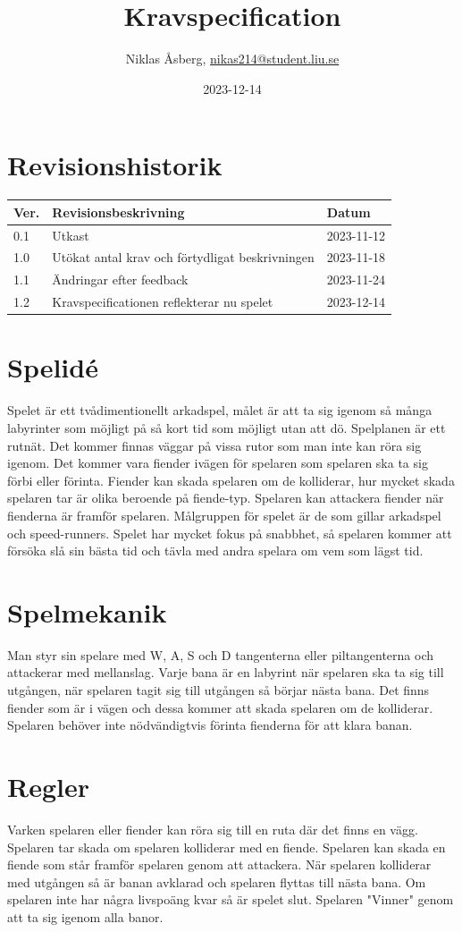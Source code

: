 \documentclass{TDP005mall}
\author{Niklas Åsberg, \url{nikas214@student.liu.se}}
\title{Kravspecification}
\date{2023-12-14}
\begin{document}
\projectpage
\section{Revisionshistorik}
\begin{table}[!h]
\begin{tabularx}{\linewidth}{|l|X|l|}
\hline
Ver. & Revisionsbeskrivning & Datum \\\hline
0.1 & Utkast & 2023-11-12 \\\hline
1.0 & Utökat antal krav och förtydligat beskrivningen & 2023-11-18 \\\hline
1.1 & Ändringar efter feedback & 2023-11-24 \\\hline
1.2 & Kravspecificationen reflekterar nu spelet & 2023-12-14 \\\hline
\end{tabularx}
\end{table}

\tableofcontents
\newpage

\section{Spelidé}
Spelet är ett tvådimentionellt arkadspel, målet är att ta sig igenom så många labyrinter som möjligt på så kort tid som möjligt utan att dö.
Spelplanen är ett rutnät. Det kommer finnas väggar på vissa rutor som man inte kan röra sig igenom.
Det kommer vara fiender ivägen för spelaren som spelaren ska ta sig förbi eller förinta. 
Fiender kan skada spelaren om de kolliderar, hur mycket skada spelaren tar är olika beroende på fiende-typ.
Spelaren kan attackera fiender när fienderna är framför spelaren.
Målgruppen för spelet är de som gillar arkadspel och speed-runners.
Spelet har mycket fokus på snabbhet, så spelaren kommer att försöka slå sin bästa tid och tävla med andra spelara om vem som lägst tid.

\section{Spelmekanik}
Man styr sin spelare med W, A, S och D tangenterna eller piltangenterna och attackerar med mellanslag. Varje bana är en labyrint när spelaren ska ta sig till utgången, när spelaren tagit sig till utgången så börjar nästa bana.
Det finns fiender som är i vägen och dessa kommer att skada spelaren om de kolliderar.
Spelaren behöver inte nödvändigtvis förinta fienderna för att klara banan.

\section{Regler}
Varken spelaren eller fiender kan röra sig till en ruta där det finns en vägg.
Spelaren tar skada om spelaren kolliderar med en fiende.
Spelaren kan skada en fiende som står framför spelaren genom att attackera.
När spelaren kolliderar med utgången så är banan avklarad och spelaren flyttas till nästa bana.
Om spelaren inte har några livspoäng kvar så är spelet slut.
Spelaren "Vinner" genom att ta sig igenom alla banor.
\end{document}
